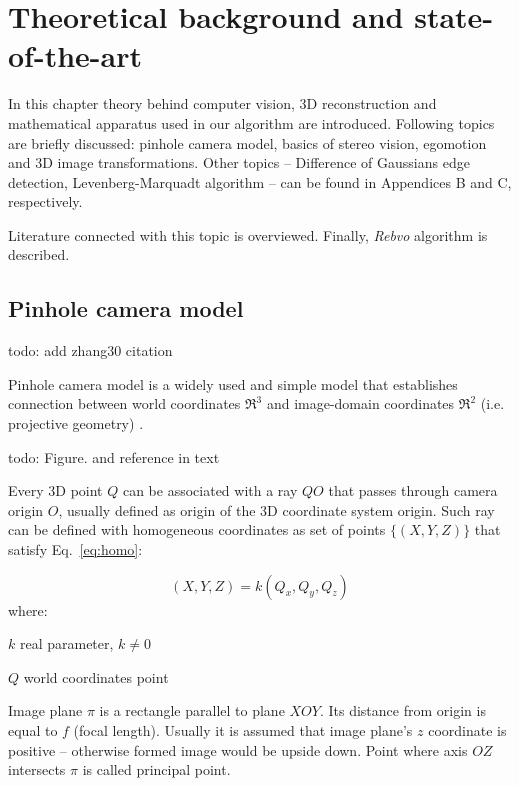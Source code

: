 \chapter{Theoretical background and state-of-the-art}
\label{cha:intro}


In this chapter theory behind computer vision, 3D reconstruction and mathematical apparatus used in our algorithm are introduced. Following topics are briefly discussed: pinhole camera model, basics of stereo vision, egomotion and 3D image transformations. Other topics -- Difference of Gaussians edge detection, Levenberg-Marquadt algorithm -- can be found in Appendices B and C, respectively.

Literature connected with this topic is overviewed. Finally, \textit{Rebvo} algorithm \cite{jose2015realtime} is described.


\section{Pinhole camera model}
\label{sec:pinhole}

todo: add zhang30 citation

Pinhole camera model is a widely used and simple model that establishes connection between world coordinates $\Re^3$ and image-domain coordinates $\Re^2$ (i.e. projective geometry) \cite{hartley2003multiple}.

todo: Figure. and reference in text

Every 3D point $Q$ can be associated with a ray $QO$ that passes through camera origin $O$, usually defined as origin of the 3D coordinate system origin. Such ray can be defined with homogeneous coordinates as set of points $\{(X, Y, Z)\}$ that satisfy Eq.~\ref{eq:homo}:

\begin{equation}
(X, Y, Z) = k(Q_x, Q_y, Q_z)
\label{eq:homo}
\end{equation}
where:
\begin{eqwhere}[2cm]
	\item[$k$] real parameter, \(k \neq 0\)
	\item[$Q$] world coordinates point
\end{eqwhere}

Image plane \(\pi\) is a rectangle parallel to plane \(XOY\). Its distance from origin is equal to \(f\) (focal length). Usually it is assumed that image plane's \(z\) coordinate is positive -- otherwise formed image would be upside down. Point where axis \(OZ\) intersects \(\pi\) is called principal point.

